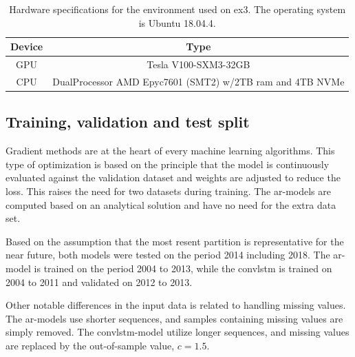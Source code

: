 \begin{table}[ht]
    \centering
    \begin{tabular}{c|c}
        Device &  Type  \\ \hline
        GPU & Tesla V100-SXM3-32GB \\
        CPU & DualProcessor AMD Epyc7601 (SMT2) w/2TB ram and 4TB NVMe 
    \end{tabular}
    \caption{Hardware specifications for the environment used on \acrshort{ex3}. The operating system is Ubuntu 18.04.4.}
    \label{tab:hardware_ex3}
\end{table}


\subsection{Training, validation and test split}
Gradient methods are at the heart of every machine 
learning algorithms. This type of optimization is based on the principle that the model is continuously evaluated against the validation dataset and weights are adjusted to reduce the loss. This raises the need for two datasets during training. The \acrshort{ar}-models are computed based on an analytical solution and have no need for the extra data set. 

Based on the assumption that the most resent partition is representative for the near future, both models were tested on the period 2014 including 2018. The \acrshort{ar}-model is trained on the period 2004 to 2013, while the \acrshort{convlstm} is trained on  2004 to 2011 and validated on 2012 to 2013.

Other notable differences in the input data is related to handling missing values.  
The \acrshort{ar}-models use shorter sequences, and samples containing missing values are simply removed. The \acrshort{convlstm}-model utilize longer sequences, and missing values are replaced by the out-of-sample value, $c=1.5$. 

